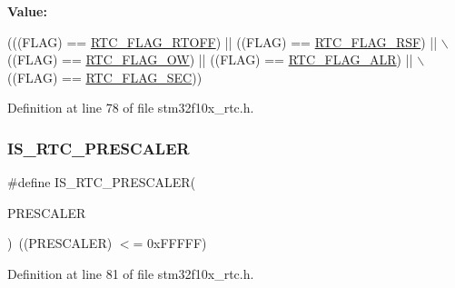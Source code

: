 {\bfseries Value\+:}
\begin{DoxyCode}
(((FLAG) == \hyperlink{group___r_t_c__interrupts__flags_ga203dcbb991497e4d0e6722815f6db942}{RTC\_FLAG\_RTOFF}) || ((FLAG) == \hyperlink{group___r_t_c__interrupts__flags_ga78c4245996bef8d5f39226b6e37ed9c0}{RTC\_FLAG\_RSF}) || \(\backslash\)
                               ((FLAG) == \hyperlink{group___r_t_c__interrupts__flags_ga4e321e359b914d7ed10eed985f8b4811}{RTC\_FLAG\_OW}) || ((FLAG) == 
      \hyperlink{group___r_t_c__interrupts__flags_gaed4375a7ea5a147f83c6cf4bfa805caf}{RTC\_FLAG\_ALR}) || \(\backslash\)
                               ((FLAG) == \hyperlink{group___r_t_c__interrupts__flags_ga8babb2c823c2097bf4a4ef0c20ef7367}{RTC\_FLAG\_SEC}))
\end{DoxyCode}


Definition at line 78 of file stm32f10x\+\_\+rtc.\+h.

\mbox{\label{group___r_t_c__interrupts__flags_ga483b9ec67246cbfb2874c5a85f0cb4d8}} 
\subsubsection{\texorpdfstring{I\+S\+\_\+\+R\+T\+C\+\_\+\+P\+R\+E\+S\+C\+A\+L\+ER}{IS\_RTC\_PRESCALER}}
{\footnotesize\ttfamily \#define I\+S\+\_\+\+R\+T\+C\+\_\+\+P\+R\+E\+S\+C\+A\+L\+ER(\begin{DoxyParamCaption}\item[{}]{P\+R\+E\+S\+C\+A\+L\+ER }\end{DoxyParamCaption})~((P\+R\+E\+S\+C\+A\+L\+ER) $<$= 0x\+F\+F\+F\+F\+F)}



Definition at line 81 of file stm32f10x\+\_\+rtc.\+h.

\mbox{\label{group___r_t_c__interrupts__flags_gaed4375a7ea5a147f83c6cf4bfa805caf}} 
